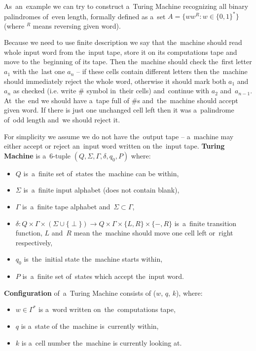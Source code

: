 \documentclass[english,shortabstract,mgr]{iithesis}
\begin{document}
As~an~example we can try to construct a~Turing Machine recognizing all binary palindromes of~even length,
formally defined as a~set $A = \{ ww^R : w \in \{0,1\}^* \}$ (where $^R$ means reversing given word).

Because we need to use finite description we say that the~machine should read whole input word
from the~input tape, store it on its computations tape and move to the~beginning of its tape.
Then the~machine should check the~first letter $a_1$ with the~last one $a_n$ -- if these cells
contain different letters then the~machine should immediately reject the whole word,
otherwise it should mark both $a_1$ and $a_n$ as checked (i.e. write $\#$ symbol in~their cells)
and~continue with $a_2$ and~$a_{n-1}$. At~the~end we should have a~tape full of $\#$s and~the~machine
should accept given word. If there is just one unchanged cell left then it was a~palindrome
of~odd length and~we should reject it.

For simplicity we assume we do not have the~output tape -- a~machine may either accept or reject
an~input word written on the~input tape. \textbf{Turing Machine} is a~$6$-tuple
$(Q,\Sigma,\Gamma,\delta,q_0,P)$ where:
\begin{itemize}
  \item $Q$ is~a~finite set of~states the~machine can be within,
  \item $\Sigma$ is~a~finite input alphabet (does not contain blank),
  \item $\Gamma$ is~a~finite tape alphabet and~$\Sigma \subset \Gamma$,
  \item $\delta: Q \times \Gamma \times \left( \Sigma \cup \{\perp\} \right)
      \rightarrow Q \times \Gamma \times \{L,R\} \times \{-,R\}$  is~a~finite
      transition function, $L$ and~$R$ mean the~machine should move one cell
      left or~right respectively,
  \item $q_0$ is~the~initial state the~machine starts within,
  \item $P$ is~a~finite set of~states which accept the~input word.
\end{itemize}

\textbf{Configuration} of~a~Turing Machine consists of ($w$, $q$, $k$), where:
\begin{itemize}
  \item $w \in \Gamma^*$ is a~word written on~the~computations tape,
  \item $q$ is a~state of the~machine is~currently within,
  \item $k$ is a~cell number the~machine is currently looking at.
\end{itemize}
\end{document}
